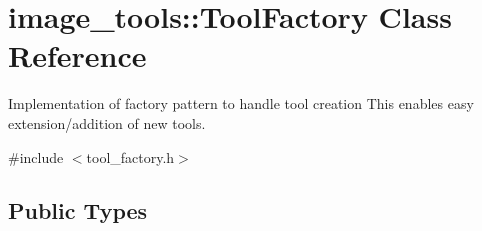 \hypertarget{classimage__tools_1_1ToolFactory}{}\section{image\+\_\+tools\+:\+:Tool\+Factory Class Reference}
\label{classimage__tools_1_1ToolFactory}


Implementation of factory pattern to handle tool creation This enables easy extension/addition of new tools.  




{\ttfamily \#include $<$tool\+\_\+factory.\+h$>$}

\subsection*{Public Types}
